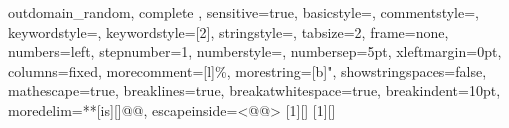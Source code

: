 {{  outdomain_random, complete
  },
  sensitive=true,
  basicstyle=\mznfont,
  commentstyle=\color[rgb]{0.9,0.1,0.1},
  keywordstyle=\color[rgb]{0,0.5,0},
  keywordstyle=[2]\color{blue},
  stringstyle=\color{orange},
  tabsize=2,
  frame=none,
  numbers=left,
  stepnumber=1,
  numberstyle=\tiny,
  numbersep=5pt,
  xleftmargin=0pt, %
  columns=fixed, %
  morecomment=[l]{\%},
  morestring=[b]",
  showstringspaces=false,
  mathescape=true,
  breaklines=true,
  breakatwhitespace=true,
  breakindent=10pt, %
  moredelim=**[is][\color{Melon}]{@}{@},
  escapeinside={{<@}{@>}}
}
[1][]{\lstset{language=Mzn,#1}}{}
[1][]{\lstset{language=Mzn,numbers=none,xleftmargin=0pt,#1}}{}
\newcommand{\mzninline}[1]{\lstinline[{language=Mzn}]|#1|}
\newcommand{\mzninlinebar}[1]{\lstinline[{language=Mzn}]!#1!}
